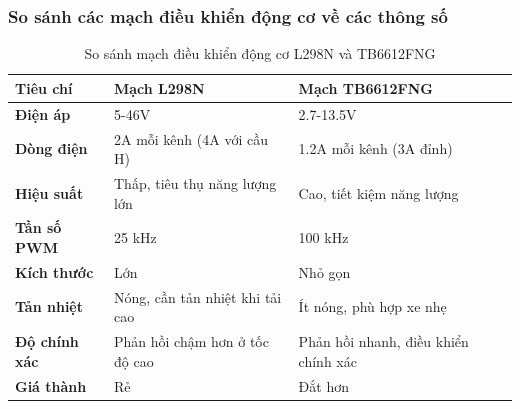             \subsubsection{So sánh các mạch điều khiển động cơ về các thông số}
                \begin{table}[H]
                    \centering
                    \caption{So sánh mạch điều khiển động cơ L298N và TB6612FNG}
                    \label{tab:compare_motor_driver}
                    \begin{tabular}{|p{3cm}|p{4cm}|p{4cm}|}
                        \hline
                        \textbf{Tiêu chí} & \textbf{Mạch L298N} & \textbf{Mạch TB6612FNG} \\
                        \hline
                        \textbf{Điện áp} & 5-46V & 2.7-13.5V \\
                        \hline
                        \textbf{Dòng điện} & 2A mỗi kênh (4A với cầu H) & 1.2A mỗi kênh (3A đỉnh) \\
                        \hline
                        \textbf{Hiệu suất} & Thấp, tiêu thụ năng lượng lớn & Cao, tiết kiệm năng lượng \\
                        \hline
                        \textbf{Tần số PWM} & 25 kHz & 100 kHz \\
                        \hline
                        \textbf{Kích thước} & Lớn & Nhỏ gọn \\
                        \hline
                        \textbf{Tản nhiệt} & Nóng, cần tản nhiệt khi tải cao & Ít nóng, phù hợp xe nhẹ \\
                        \hline
                        \textbf{Độ chính xác} & Phản hồi chậm hơn ở tốc độ cao & Phản hồi nhanh, điều khiển chính xác \\
                        \hline
                        \textbf{Giá thành} & Rẻ& Đắt hơn \\
                        \hline
                        \end{tabular}
                \end{table}
